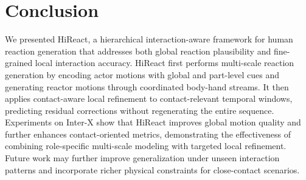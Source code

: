 \documentclass{article}
\begin{document}
\section{Conclusion}

We presented HiReact, a hierarchical interaction-aware framework for human reaction generation that addresses both global reaction plausibility and fine-grained local interaction accuracy. HiReact first performs multi-scale reaction generation by encoding actor motions with global and part-level cues and generating reactor motions through coordinated body-hand streams. It then applies contact-aware local refinement to contact-relevant temporal windows, predicting residual corrections without regenerating the entire sequence. Experiments on Inter-X show that HiReact improves global motion quality and further enhances contact-oriented metrics, demonstrating the effectiveness of combining role-specific multi-scale modeling with targeted local refinement. Future work may further improve generalization under unseen interaction patterns and incorporate richer physical constraints for close-contact scenarios.



\end{document}
